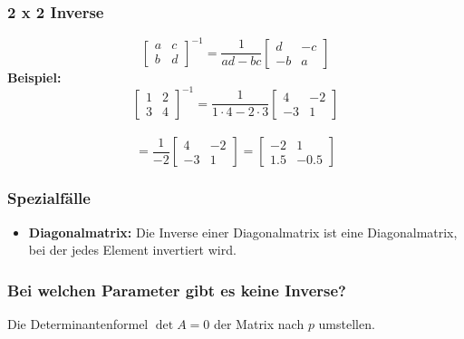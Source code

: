 \documentclass[12pt,a4paper]{article}
\begin{document}
\subsubsection{2 x 2 Inverse}
\[
\begin{bmatrix}
    a & c \\
    b & d
\end{bmatrix}^{-1}
=
\frac{1}{ad - bc}
\begin{bmatrix}
    d & -c \\
    -b & a
\end{bmatrix}
\]
\textbf{Beispiel:}
\[
\begin{bmatrix}
    1 & 2 \\
    3 & 4
\end{bmatrix}^{-1}
=
\frac{1}{1 \cdot 4 - 2 \cdot 3}
\begin{bmatrix}
    4 & -2 \\
    -3 & 1
\end{bmatrix}
\]
\\
\[
=
\frac{1}{-2}
\begin{bmatrix}
    4 & -2 \\
    -3 & 1
\end{bmatrix}
=
\begin{bmatrix}
    -2 & 1 \\
    1.5 & -0.5
\end{bmatrix}
\]

\subsubsection{Spezialfälle}
\begin{itemize}
    \item \textbf{Diagonalmatrix:} Die Inverse einer Diagonalmatrix ist eine Diagonalmatrix, bei der jedes Element invertiert wird.    
\end{itemize}

\subsubsection{Bei welchen Parameter gibt es keine Inverse?}
Die Determinantenformel $\det A = 0$ der Matrix nach $p$ umstellen. 
\end{document}
